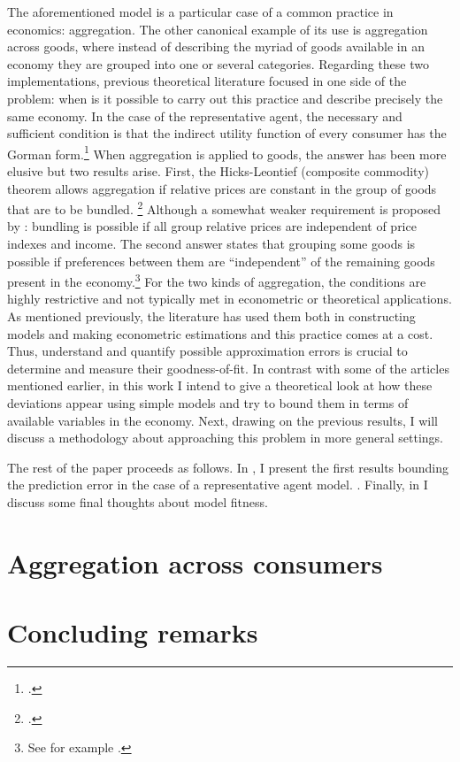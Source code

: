 \documentclass[english, a4paper,12pt]{article}
\begin{document}
The aforementioned model is a particular case of a common practice in economics: aggregation. The other canonical example of its use is aggregation across goods, where instead of describing the myriad of goods available in an economy they are grouped into one or several categories. Regarding these two implementations, previous theoretical literature focused in one side of the problem: when is it possible to carry out this practice and describe precisely the same economy. In the case of the representative agent, the necessary and sufficient condition is that the indirect utility function of every consumer has the Gorman form.\footnote{\cite{Gorman53}.} When aggregation is applied to goods, the answer has been more elusive but two results arise. First, the Hicks-Leontief (composite commodity) theorem allows aggregation if relative prices are constant in the group of goods that are to be bundled. \footnote{\cite{Leontief36, HicksBook}.} Although a somewhat weaker requirement is proposed by \cite{Lewbel96}: bundling is possible if all group relative prices are independent of price indexes and income. The second answer states that grouping some goods is possible if preferences between them are ``independent'' of the remaining goods present in the economy.\footnote{See for example \cite{GormanSeparability}.} For the two kinds of aggregation, the conditions are highly restrictive and not typically met in econometric or theoretical applications. As mentioned previously, the literature has used them both in constructing models and making econometric estimations and this practice comes at a cost. Thus, understand and quantify possible approximation errors is crucial to determine and measure their goodness-of-fit. In contrast with some of the articles mentioned earlier, in this work I intend to give a theoretical look at how these deviations appear using simple models and try to bound them in terms of available variables in the economy. Next, drawing on the previous results, I will discuss a methodology about approaching this problem in more general settings.

The rest of the paper proceeds as follows. In , I present the first results bounding the prediction error in the case of a representative agent model. . Finally, in  I discuss some final thoughts about model fitness.

\section{Aggregation across consumers} \label{sec:repagent}


\section{Concluding remarks} \label{sec:conclusion}



\end{document}
